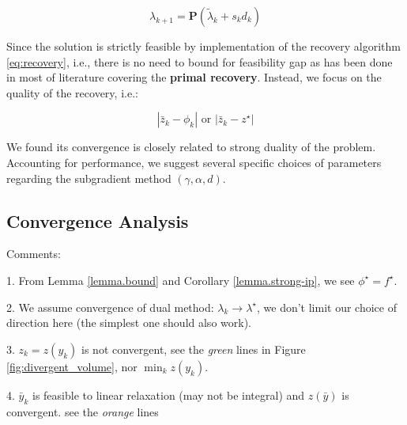 \documentclass[../main]{subfiles}
\begin{document}
\[\lambda_{k+1} = \mathbf{P}(\tilde\lambda_{k} + s_{k}d_{k})\]

Since the solution is strictly feasible by implementation of the
recovery algorithm \eqref{eq:recovery}, i.e., there is no need to bound for feasibility gap
as has been done in most of literature covering the \textbf{primal
  recovery}. Instead, we focus on the quality of the recovery, i.e.:

\[
  |\bar z_k - \phi_k| \textrm { or } |\bar z_k - z^\star|
\]

We found its convergence is closely related to strong duality of the problem. Accounting for performance,
we suggest several specific choices of parameters regarding the subgradient method \((\gamma, \alpha, d)\).


\subsection{Convergence Analysis}\label{dual.analysis}

Comments:

1. From Lemma \ref{lemma.bound} and Corollary \ref{lemma.strong-ip}, we see \(\phi^\star = f^\star\).

2. We assume convergence of dual method: \(\lambda_k \to \lambda^\star\), we don't limit our choice of direction here (the simplest one should also work).

3. \(z_k = z(y_k)\) is not convergent, see the \emph{green} lines in Figure \ref{fig:divergent_volume}, nor \(\min_k z(y_k)\).

4. \(\bar y_k\) is feasible to linear relaxation (may not be integral) and
\(z(\bar y)\) is convergent. see the \emph{orange} lines



\end{document}
